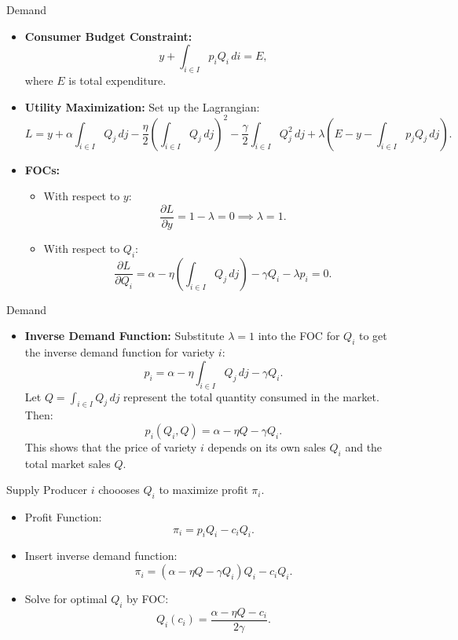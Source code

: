 \documentclass[aspectratio=169]{beamer}  %
\begin{document}
\begin{frame}{Demand}
    \begin{itemize}
        \item \textbf{Consumer Budget Constraint:}
        \[
        y + \int_{i \in I} p_i Q_i \, di = E,
        \]
        where \( E \) is total expenditure.
        \item \textbf{Utility Maximization:} Set up the Lagrangian:
        \[
        L = y + \alpha \int_{i \in I} Q_j \, dj 
          - \frac{\eta}{2} \left( \int_{i \in I} Q_j \, dj \right)^2 
          - \frac{\gamma}{2} \int_{i \in I} Q_j^2 \, dj 
          + \lambda \left( E - y - \int_{i \in I} p_j Q_j \, dj \right).
        \]
        \item \textbf{FOCs:}
            \begin{itemize}
                \item With respect to \( y \):
                \[
                \frac{\partial L}{\partial y} = 1 - \lambda = 0 \implies \lambda = 1.
                \]
                \item With respect to \( Q_i \):
                \[
                \frac{\partial L}{\partial Q_i} = \alpha - \eta \left( \int_{i \in I} Q_j \, dj \right) - \gamma Q_i - \lambda p_i = 0.
                \]
            \end{itemize}
        
    \end{itemize}
\end{frame}


\begin{frame}{Demand}
    \begin{itemize}
        \item \textbf{Inverse Demand Function:} Substitute \( \lambda = 1 \) into the FOC for \( Q_i \) to get the inverse demand function for variety \( i \):
        \[
        p_i = \alpha - \eta \int_{i \in I} Q_j \, dj - \gamma Q_i.
        \]
        Let \( Q = \int_{i \in I} Q_j \, dj \) represent the total quantity consumed in the market. Then:
        \[
        p_i(Q_i, Q) = \alpha - \eta Q - \gamma Q_i.
        \]
        This shows that the price of variety \( i \) depends on its own sales \( Q_i \) and the total market sales \( Q \).
    \end{itemize}
\end{frame}

\begin{frame}{Supply}
    Producer \(i\) choooses \(Q_i\) to maximize profit \(\pi_i\).
    \begin{itemize}
        \item Profit Function:
        \[
        \pi_i = p_i Q_i - c_i Q_i.
        \]
        \item Insert inverse demand function:
        \[
        \pi_i = (\alpha - \eta Q - \gamma Q_i) Q_i - c_i Q_i.
        \]
        \item Solve for optimal \(Q_i\) by FOC:
        \[
        Q_i(c_i) = \frac{\alpha - \eta Q - c_i}{2\gamma}.
        \]        
    \end{itemize}
\end{frame}
\end{document}
